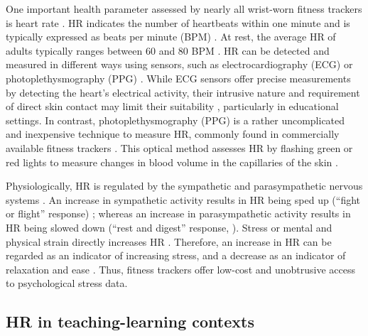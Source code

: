 \documentclass[preprint,
3p]{elsarticle} %
\begin{document}
One important health parameter assessed by nearly all wrist-worn fitness
trackers is heart rate \citep{scalise2018wearables}. HR indicates the
number of heartbeats within one minute and is typically expressed as
beats per minute (BPM)
\citep{berntson2007cardiovascular, hottenrott2007}. At rest, the average
HR of adults typically ranges between 60 and 80 BPM
\citep{sammito2015guideline}. HR can be detected and measured in
different ways using sensors, such as electrocardiography (ECG) or
photoplethysmography (PPG) \citep{mukhopadhyay2017wearable}. While ECG
sensors offer precise measurements by detecting the heart's electrical
activity, their intrusive nature and requirement of direct skin contact
may limit their suitability \citep{kranjec2014non}, particularly in
educational settings. In contrast, photoplethysmography (PPG) is a
rather uncomplicated and inexpensive technique to measure HR, commonly
found in commercially available fitness trackers
\citep{castaneda2018review}. This optical method assesses HR by flashing
green or red lights to measure changes in blood volume in the
capillaries of the skin \citep{allen2007photoplethysmography}.

Physiologically, HR is regulated by the sympathetic and parasympathetic
nervous systems \citep{pham2021}. An increase in sympathetic activity
results in HR being sped up (``fight or flight'' response)
\citep{taelman2009influence}; whereas an increase in parasympathetic
activity results in HR being slowed down (``rest and digest'' response,
\citet{battipaglia2015}). Stress or mental and physical strain directly
increases HR \citep{custodis2014heart, sachs2014}. Therefore, an
increase in HR can be regarded as an indicator of increasing stress, and
a decrease as an indicator of relaxation and ease \citep{kyriacou1978}.
Thus, fitness trackers offer low-cost and unobtrusive access to
psychological stress data.

\subsection{HR in teaching-learning
contexts}\label{hr-in-teaching-learning-contexts}
\end{document}
